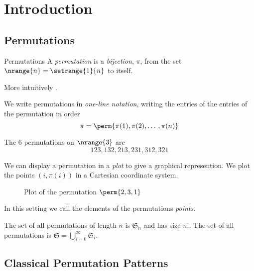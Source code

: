 \section{Introduction}
\label{sec:Introduction}
\subsection{Permutations}
\label{sub:Permutations}

\begin{frame}{Permutations}
  A \emph{permutation} is a \emph{bijection}, \(\pi\), from the set
  \(\nrange{n} = \setrange{1}{n}\) to itself.

  More intuitively .

  We write permutations in \emph{one-line notation}, writing the entries of
  the entries of the permutation in order
  \begin{equation*}
    \pi = \perm{\pi(1),\pi(2),\dotso,\pi(n)}
  \end{equation*}
  \begin{example} The \(6\) permutations on \(\nrange{3}\) are
    \begin{equation*}
      123, 132, 213, 231, 312, 321
    \end{equation*}
  \end{example}
\end{frame}

\begin{frame}
  We can display a permutation in a \emph{plot} to give a graphical
  represention. We plot the points \((i,\pi(i))\) in a Cartesian coordinate
  system.
  \begin{figure}[htb]
    \centering
    \caption{Plot of the permutation \(\perm{2,3,1}\)}
  \end{figure}
  In this setting we call the elements of the permutations \emph{points}.

  The set of all permutations of length \(n\) is \(\mathfrak{S}_n\) and
  has size \(n!\). The set of all permutations is
  \(\mathfrak{S}=\bigcup_{i=0}^{\infty}\mathfrak{S}_i\).
\end{frame}
\subsection{Classical Permutation Patterns}
\label{sub:Classical Permutation Patterns}

